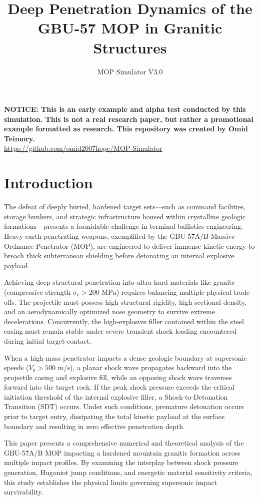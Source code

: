 \documentclass[11pt,a4paper]{article}
\title{Deep Penetration Dynamics of the GBU-57 MOP in Granitic Structures}
\author{MOP Simulator V3.0}
\date{}
\begin{document}
\maketitle

\begin{center}
\textbf{NOTICE: This is an early example and alpha test conducted by this simulation. This is not a real research paper, but rather a promotional example formatted as research. This repository was created by Omid Teimory.} \\
\url{https://github.com/omid2007hope/MOP-Simulator}
\end{center}

\section{Introduction}
The defeat of deeply buried, hardened target sets—such as command facilities, storage bunkers, and strategic infrastructure housed within crystalline geologic formations—presents a formidable challenge in terminal ballistics engineering. Heavy earth-penetrating weapons, exemplified by the GBU-57A/B Massive Ordnance Penetrator (MOP), are engineered to deliver immense kinetic energy to breach thick subterranean shielding before detonating an internal explosive payload.

Achieving deep structural penetration into ultra-hard materials like granite (compressive strength $\sigma_c > 200\text{ MPa}$) requires balancing multiple physical trade-offs. The projectile must possess high structural rigidity, high sectional density, and an aerodynamically optimized nose geometry to survive extreme decelerations. Concurrently, the high-explosive filler contained within the steel casing must remain stable under severe transient shock loading encountered during initial target contact.

When a high-mass penetrator impacts a dense geologic boundary at supersonic speeds ($V_0 > 500\text{ m/s}$), a planar shock wave propagates backward into the projectile casing and explosive fill, while an opposing shock wave traverses forward into the target rock. If the peak shock pressure exceeds the critical initiation threshold of the internal explosive filler, a Shock-to-Detonation Transition (SDT) occurs. Under such conditions, premature detonation occurs prior to target entry, dissipating the total kinetic payload at the surface boundary and resulting in zero effective penetration depth.

This paper presents a comprehensive numerical and theoretical analysis of the GBU-57A/B MOP impacting a hardened mountain granitic formation across multiple impact profiles. By examining the interplay between shock pressure generation, Hugoniot jump conditions, and energetic material sensitivity criteria, this study establishes the physical limits governing supersonic impact survivability.
\end{document}

